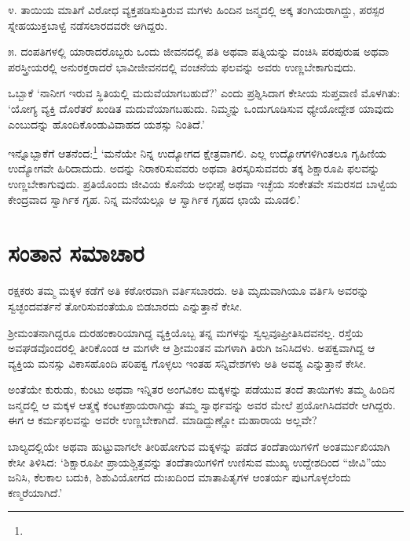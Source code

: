 ೪. ತಾಯಿಯ ಮಾತಿಗೆ ವಿರೋಧ ವ್ಯಕ್ತಪಡಿಸುತ್ತಿರುವ ಮಗಳು ಹಿಂದಿನ ಜನ್ಮದಲ್ಲಿ ಅಕ್ಕ ತಂಗಿಯರಾಗಿದ್ದು, ಪರಸ್ಪರ ಸ್ನೇಹಯುಕ್ತಬಾಳ್ವೆ ನಡೆಸಲಾರದವರೇ ಆಗಿದ್ದರು.

೫. ದಂಪತಿಗಳಲ್ಲಿ ಯಾರಾದರೊಬ್ಬರು ಒಂದು ಜೀವನದಲ್ಲಿ ಪತಿ ಅಥವಾ ಪತ್ನಿಯನ್ನು ವಂಚಿಸಿ ಪರಪುರುಷ ಅಥವಾ ಪರಸ್ತ್ರೀಯರಲ್ಲಿ ಅನುರಕ್ತರಾದರೆ ಭಾವೀಜೀವನದಲ್ಲಿ ವಂಚನೆಯ ಫಲವನ್ನು ಅವರು ಉಣ್ಣಬೇಕಾಗುವುದು.

ಒಬ್ಬಾಕೆ ‘ನಾನೀಗ ಇರುವ ಸ್ಥಿತಿಯಲ್ಲಿ ಮದುವೆಯಾಗಬಹುದೆ?’ ಎಂದು ಪ್ರಶ್ನಿಸಿದಾಗ ಕೇಸೀಯ ಸುಪ್ತವಾಣಿ ಮೊಳಗಿತು: ‘ಯೋಗ್ಯ ವ್ಯಕ್ತಿ ದೊರೆತರೆ ಖಂಡಿತ ಮದುವೆಯಾಗಬಹುದು. ನಿಮ್ಮನ್ನು ಒಂದುಗೂಡಿಸುವ ಧ್ಯೇಯೋದ್ದೇಶ ಯಾವುದು ಎಂಬುದನ್ನು ಹೊಂದಿಕೊಂಡು\break ವಿವಾಹದ ಯಶಸ್ಸು ನಿಂತಿದೆ.’

ಇನ್ನೊಬ್ಬಾಕೆಗೆ ಆತನೆಂದ:\footnote{} ‘ಮನೆಯೇ ನಿನ್ನ ಉದ್ಯೋಗದ ಕ್ಷೇತ್ರವಾಗಲಿ. ಎಲ್ಲ ಉದ್ಯೋಗ\-ಗಳಿಗಿಂತಲೂ ಗೃಹಿಣಿಯ ಉದ್ಯೋಗವೇ ಹಿರಿದಾದುದು. ಅದನ್ನು ನಿರಾಕರಿಸುವವರು ಅಥವಾ ತಿರಸ್ಕರಿಸುವವರು ತಕ್ಕ ಶಿಕ್ಷಾರೂಪಿ ಫಲವನ್ನು ಉಣ್ಣಬೇಕಾಗುವುದು. ಪ್ರತಿಯೊಂದು ಜೀವಿಯ ಕೊನೆಯ ಅಭೀಪ್ಸೆ ಅಥವಾ ಇಚ್ಛೆಯ ಸಂಕೇತವೇ ಸಮರಸದ ಬಾಳ್ವೆಯ ಕೇಂದ್ರವಾದ ಸ್ವಾರ್ಗಿಕ ಗೃಹ. ನಿನ್ನ ಮನೆಯಲ್ಲೂ ಆ ಸ್ವಾರ್ಗಿಕ ಗೃಹದ ಛಾಯೆ ಮೂಡಲಿ.’


\section*{ಸಂತಾನ ಸಮಾಚಾರ}


ರಕ್ಷಕರು ತಮ್ಮ ಮಕ್ಕಳ ಕಡೆಗೆ ಅತಿ ಕಠೋರವಾಗಿ ವರ್ತಿಸಬಾರದು. ಅತಿ ಮೃದುವಾಗಿಯೂ ವರ್ತಿಸಿ ಅವರನ್ನು ಸ್ವಚ್ಛಂದವರ್ತನೆ ತೋರಿಸುವಂತೆಯೂ ಬಿಡಬಾರದು ಎನ್ನುತ್ತಾನೆ ಕೇಸೀ.

ಶ‍್ರೀಮಂತನಾಗಿದ್ದರೂ ದುರಹಂಕಾರಿಯಾಗಿದ್ದ ವ್ಯಕ್ತಿಯೊಬ್ಬ ತನ್ನ ಮಗಳನ್ನು ಸ್ವಲ್ಪವೂ\break ಪ್ರೀತಿಸಿದವನಲ್ಲ. ರಸ್ತೆಯ ಅವಘಡವೊಂದರಲ್ಲಿ ತೀರಿಕೊಂಡ ಆ ಮಗಳೇ ಆ ಶ‍್ರೀಮಂತನ ಮಗಳಾಗಿ ತಿರುಗಿ ಜನಿಸಿದಳು. ಅಪಕ್ವವಾಗಿದ್ದ ಆ ವ್ಯಕ್ತಿಯ ಮನಸ್ಸು ವಿಕಾಸಹೊಂದಿ ಪರಿಪಕ್ವ ಗೊಳ್ಳಲು ಇಂತಹ ಸನ್ನಿವೇಶಗಳು ಅತಿ ಅವಶ್ಯ ಎನ್ನುತ್ತಾನೆ ಕೇಸೀ.

ಅಂತೆಯೇ ಕುರುಡು, ಕುಂಟು ಅಥವಾ ಇನ್ನಿತರ ಅಂಗವಿಕಲ ಮಕ್ಕಳನ್ನು ಪಡೆಯುವ ತಂದೆ ತಾಯಿಗಳು ತಮ್ಮ ಹಿಂದಿನ ಜನ್ಮದಲ್ಲಿ ಆ ಮಕ್ಕಳ ಆತ್ಮಕ್ಕೆ ಕಂಟಕಪ್ರಾಯರಾಗಿದ್ದು ತಮ್ಮ ಸ್ವಾರ್ಥವನ್ನು ಅವರ ಮೇಲೆ ಪ್ರಯೋಗಿಸಿದವರೇ ಆಗಿದ್ದರು. ಈಗ ಆ ಕರ್ಮಫಲವನ್ನು ಅವರೇ ಉಣ್ಣಬೇಕಾಗಿದೆ. ಮಾಡಿದ್ದುಣ್ಣೋ ಮಹಾರಾಯ ಅಲ್ಲವೇ?

ಬಾಲ್ಯದಲ್ಲಿಯೇ ಅಥವಾ ಹುಟ್ಟುವಾಗಲೇ ತೀರಿಹೋಗುವ ಮಕ್ಕಳನ್ನು ಪಡೆದ ತಂದೆತಾಯಿಗಳಿಗೆ ಅಂತರ್ಮುಖಿಯಾಗಿ ಕೇಸೀ ತಿಳಿಸಿದ: ‘ಶಿಕ್ಷಾರೂಪೀ ಪ್ರಾಯಶ್ಚಿತ್ತವನ್ನು ತಂದೆತಾಯಿಗಳಿಗೆ ಉಣಿಸುವ ಮುಖ್ಯ ಉದ್ದೇಶದಿಂದ “ಜೀವಿ”ಯು ಜನಿಸಿ, ಕೆಲಕಾಲ ಬದುಕಿ, ಶಿಶುವಿಯೋಗದ ದುಃಖದಿಂದ ಮಾತಾಪಿತೃಗಳ ಆಂತರ್ಯ ಪುಟಗೊಳ್ಳಲೆಂದು ಕಣ್ಮರೆಯಾಗಿದೆ.’



